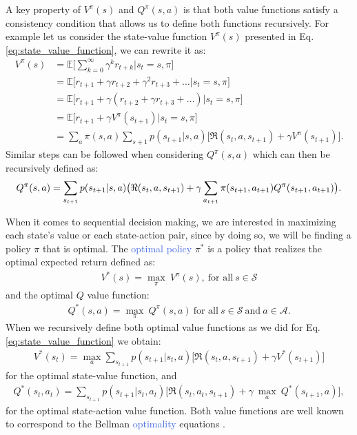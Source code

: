 A key property of $V^{\pi}(s)$ and $Q^{\pi}(s,a)$ is that both value functions satisfy a consistency condition that allows us to define both functions recursively. For example let us consider the state-value function $V^{\pi}(s)$ presented in Eq. \ref{eq:state_value_function}, we can rewrite it as:
\begin{align}
 V^{\pi}(s) & =\mathds{E}\big[\sum_{k=0}^{\infty}\gamma^{k}r_{t+k}\big| s_t = s, \pi \big] \\ 
 & =\mathds{E}\big[r_{t+1}+\gamma r_{t+2}+\gamma^{2}r_{t+3}+\ldots \big| s_t =s , \pi \big] \\ 
 & =\mathds{E}\big[r_{t+1}+\gamma(r_{t+2}+\gamma r_{t+3}+\ldots)\big| s_t =s , \pi \big] \\
 & =\mathds{E}\big[r_{t+1}+\gamma V^{\pi}(s_{t+1}) \big| s_t =s , \pi \big] \\
 & =\sum_a \pi(s,a) \sum_{s+1} p(s_{t+1}|s,a)\big[\Re(s_t, a, s_{t+1}) + \gamma V^{\pi}(s_{t+1}) \big].
\end{align}
Similar steps can be followed when considering $Q^{\pi}(s,a)$ which can then be recursively defined as:
\begin{equation}
	Q^{\pi}(s,a) = \sum_{s_{t+1}} p(s_{t+1}|s,a)\big(\Re(s_t, a, s_{t+1}) + \\ \gamma \sum_{a_{t+1}} \pi(s_{t+1},a_{t+1}) Q^{\pi}(s_{t+1}, a_{t+1}) \big).
\end{equation}

When it comes to sequential decision making, we are interested in maximizing each state's value or each state-action pair, since by doing so, we will be finding a policy $\pi$ that is optimal. The \textcolor{RoyalBlue}{optimal policy} $\pi^{*}$ is a policy that realizes the optimal expected return defined as:
\begin{align}
 V^{*}(s)=\underset{\pi}{\max}\:V^{\pi}(s), \ \text{for all} \ s\in\mathcal{S}
\end{align}
and the optimal $Q$ value function:
\begin{align}
Q^{*}(s,a)= \underset{\pi}{\max}\:Q^{\pi}(s,a) \ \text{for all} \ s\in\mathcal{S} \ \text{and} \ a \in\mathcal{    A}.
\end{align}
When we recursively define both optimal value functions as we did for Eq. \ref{eq:state_value_function} we obtain:
\begin{align}
    V^{*}(s_t) = \underset{a}{\max}\sum_{s_{t+1}}p(s_{t+1} | s_{t}, a) \bigg[\Re (s_{t}, a, s_{t+1}) + \gamma V^{*}(s_{t+1}) \bigg]
    \label{eq:optimal_v}
\end{align}
for the optimal state-value function, and
\begin{multline}
    Q^{*}(s_t,a_t)=\sum_{s_{t+1}}p(s_{t+1} | s_{t}, a_{t})  \bigg[\Re (s_{t}, a_{t}, s_{t+1}) + \gamma \: \underset{a}{\max} \: Q^{*}(s_{t+1}, a) \bigg],
    \label{eq:optimal_q}
\end{multline}
for the optimal state-action value function. Both value functions are well known to correspond to the Bellman \textcolor{RoyalBlue}{optimality} equations \cite{bellman1966dynamic}. 

